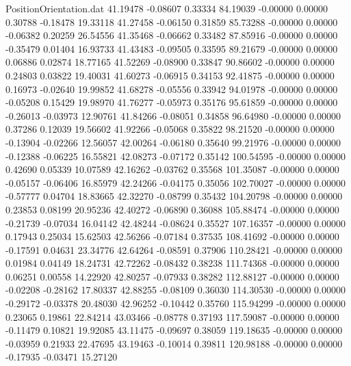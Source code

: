 \begin{filecontents}{PositionOrientation.dat}
  41.19478   -0.08607    0.33334    84.19039   -0.00000    0.00000    0.30788   -0.18478   19.33118
  41.27458   -0.06150    0.31859    85.73288   -0.00000    0.00000   -0.06382    0.20259   26.54556
  41.35468   -0.06662    0.33482    87.85916   -0.00000    0.00000   -0.35479    0.01404   16.93733
  41.43483   -0.09505    0.33595    89.21679   -0.00000    0.00000    0.06886    0.02874   18.77165
  41.52269   -0.08900    0.33847    90.86602   -0.00000    0.00000    0.24803    0.03822   19.40031
  41.60273   -0.06915    0.34153    92.41875   -0.00000    0.00000    0.16973   -0.02640   19.99852
  41.68278   -0.05556    0.33942    94.01978   -0.00000    0.00000   -0.05208    0.15429   19.98970
  41.76277   -0.05973    0.35176    95.61859   -0.00000    0.00000   -0.26013   -0.03973   12.90761
  41.84266   -0.08051    0.34858    96.64980   -0.00000    0.00000    0.37286    0.12039   19.56602
  41.92266   -0.05068    0.35822    98.21520   -0.00000    0.00000   -0.13904   -0.02266   12.56057
  42.00264   -0.06180    0.35640    99.21976   -0.00000    0.00000   -0.12388   -0.06225   16.55821
  42.08273   -0.07172    0.35142   100.54595   -0.00000    0.00000    0.42690    0.05339   10.07589
  42.16262   -0.03762    0.35568   101.35087   -0.00000    0.00000   -0.05157   -0.06406   16.85979
  42.24266   -0.04175    0.35056   102.70027   -0.00000    0.00000   -0.57777    0.04704   18.83665
  42.32270   -0.08799    0.35432   104.20798   -0.00000    0.00000    0.23853    0.08199   20.95236
  42.40272   -0.06890    0.36088   105.88474   -0.00000    0.00000   -0.21739   -0.07034   16.04142
  42.48244   -0.08624    0.35527   107.16357   -0.00000    0.00000    0.17943    0.25034   15.62503
  42.56266   -0.07184    0.37535   108.41692   -0.00000    0.00000   -0.17591    0.04631   23.34776
  42.64264   -0.08591    0.37906   110.28421   -0.00000    0.00000    0.01984    0.04149   18.24731
  42.72262   -0.08432    0.38238   111.74368   -0.00000    0.00000    0.06251    0.00558   14.22920
  42.80257   -0.07933    0.38282   112.88127   -0.00000    0.00000   -0.02208   -0.28162   17.80337
  42.88255   -0.08109    0.36030   114.30530   -0.00000    0.00000   -0.29172   -0.03378   20.48030
  42.96252   -0.10442    0.35760   115.94299   -0.00000    0.00000    0.23065    0.19861   22.84214
  43.03466   -0.08778    0.37193   117.59087   -0.00000    0.00000   -0.11479    0.10821   19.92085
  43.11475   -0.09697    0.38059   119.18635   -0.00000    0.00000   -0.03959    0.21933   22.47695
  43.19463   -0.10014    0.39811   120.98188   -0.00000    0.00000   -0.17935   -0.03471   15.27120

\end{filecontents}
